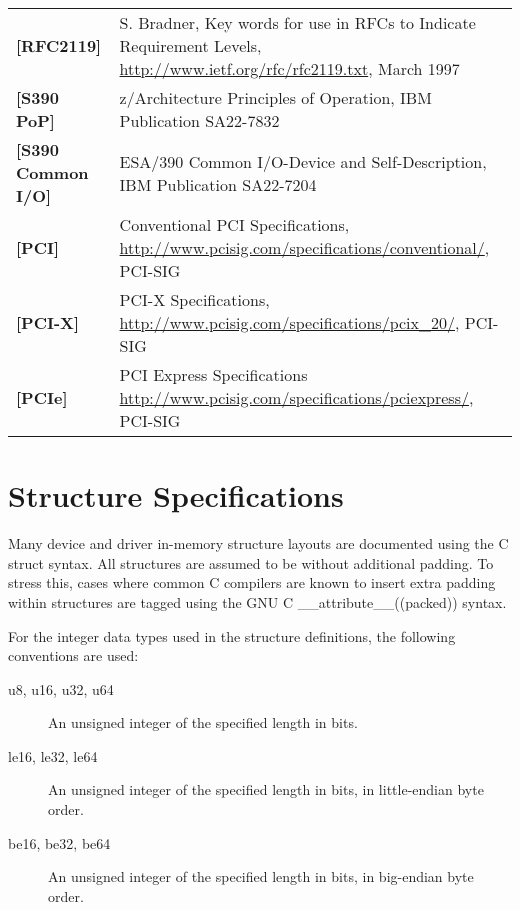 \begin{longtable}{l p{5in}}
	\label{intro:rfc2119}\textbf{[RFC2119]} & S. Bradner, Key words for use in RFCs to Indicate Requirement Levels, \newline\url{http://www.ietf.org/rfc/rfc2119.txt}, March 1997\\
	\label{intro:S390 PoP}\textbf{[S390 PoP]} & z/Architecture Principles of Operation, \newline IBM Publication SA22-7832\\
	\label{intro:S390 Common I/O}\textbf{[S390 Common I/O]} & ESA/390 Common I/O-Device and Self-Description, \newline IBM Publication SA22-7204\\
	\label{intro:PCI}\textbf{[PCI]} &
	Conventional PCI Specifications,
	\newline\url{http://www.pcisig.com/specifications/conventional/},
	PCI-SIG\\
	\label{intro:PCI-X}\textbf{[PCI-X]} &
	PCI-X Specifications,
	\newline\url{http://www.pcisig.com/specifications/pcix_20/},
	PCI-SIG\\
	\label{intro:PCI-X}\textbf{[PCIe]} &
	PCI Express Specifications
	\newline\url{http://www.pcisig.com/specifications/pciexpress/},
	PCI-SIG\\
\end{longtable}

\section{Structure Specifications}

Many device and driver in-memory structure layouts are documented using
the C struct syntax. All structures are assumed to be without additional
padding. To stress this, cases where common C compilers are known to insert
extra padding within structures are tagged using the GNU C
__attribute__((packed))  syntax.

For the integer data types used in the structure definitions, the following
conventions are used:

\begin{description}
\item[u8, u16, u32, u64] An unsigned integer of the specified length in bits.

\item[le16, le32, le64] An unsigned integer of the specified length in bits,
in little-endian byte order.

\item[be16, be32, be64] An unsigned integer of the specified length in bits,
in big-endian byte order.
\end{description}

\newpage

